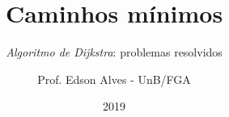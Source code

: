 \title{Caminhos mínimos}
\subtitle{\textit{Algoritmo de Dijkstra}: problemas resolvidos}
\author{Prof. Edson Alves - UnB/FGA}
\date{2019}
